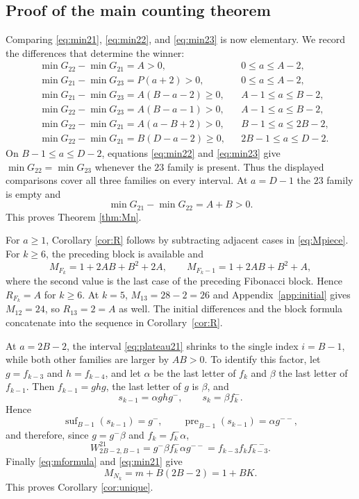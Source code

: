 \documentclass[11pt]{amsart}
\newcommand{\pre}{\operatorname{pre}}
\newcommand{\suf}{\operatorname{suf}}
\begin{document}
\subsection{Proof of the main counting theorem}
Comparing \eqref{eq:min21}, \eqref{eq:min22}, and \eqref{eq:min23} is now elementary.  We record the differences that determine the winner:
\begin{align*}
 &\min G_{22}-\min G_{21}=A>0,
 &&0\le a\le A-2,\\
 &\min G_{21}-\min G_{23}=P(a+2)>0,
 &&0\le a\le A-2,\\
 &\min G_{21}-\min G_{23}=A(B-a-2)\ge0,
 &&A-1\le a\le B-2,\\
 &\min G_{22}-\min G_{23}=A(B-a-1)>0,
 &&A-1\le a\le B-2,\\
 &\min G_{22}-\min G_{21}=A(a-B+2)>0,
 &&B-1\le a\le2B-2,\\
 &\min G_{22}-\min G_{21}=B(D-a-2)\ge0,
 &&2B-1\le a\le D-2.
\end{align*}
On $B-1\le a\le D-2$, equations \eqref{eq:min22} and \eqref{eq:min23} give $\min G_{22}=\min G_{23}$ whenever the $23$ family is present.  Thus the displayed comparisons cover all three families on every interval.  At $a=D-1$ the $23$ family is empty and
\[
 \min G_{21}-\min G_{22}=A+B>0.
\]
This proves Theorem \ref{thm:Mn}.

For $a\ge1$, Corollary \ref{cor:R} follows by subtracting adjacent cases in \eqref{eq:Mpiece}.  For $k\ge6$, the preceding block is available and
\[
 M_{F_k}=1+2AB+B^2+2A,
 \qquad
 M_{F_k-1}=1+2AB+B^2+A,
\]
where the second value is the last case of the preceding Fibonacci block.  Hence $R_{F_k}=A$ for $k\ge6$.  At $k=5$,
$M_{13}=28-2=26$ and Appendix~\ref{app:initial} gives $M_{12}=24$,
so $R_{13}=2=A$ as well.  The initial differences and the block formula
concatenate into the sequence in Corollary~\ref{cor:R}.

At $a=2B-2$, the interval \eqref{eq:plateau21} shrinks to the single index $i=B-1$, while both other families are larger by $AB>0$.
To identify this factor, let $g=f_{k-3}$ and $h=f_{k-4}$, and let
$\alpha$ be the last letter of $f_k$ and $\beta$ the last letter of
$f_{k-1}$.  Then $f_{k-1}=ghg$, the last letter of $g$ is $\beta$, and
\[
 s_{k-1}=\alpha ghg^{-},\qquad s_k=\beta f_k^{-}.
\]
Hence
\[
 \suf_{B-1}(s_{k-1})=g^{-},\qquad
 \pre_{B-1}(s_{k-1})=\alpha g^{--},
\]
and therefore, since $g=g^{-}\beta$ and $f_k=f_k^{-}\alpha$,
\[
 W^{21}_{2B-2,B-1}
   =g^{-}\beta f_k^{-}\alpha g^{--}
   =f_{k-3}f_kf_{k-3}^{--}.
\]
Finally \eqref{eq:mformula} and \eqref{eq:min21} give
\[
 M_{N_k}=m+B(2B-2)=1+BK.
\]
This proves Corollary \ref{cor:unique}.
\end{document}
